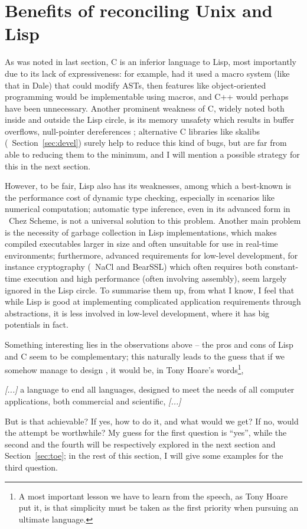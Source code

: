 \section{Benefits of reconciling Unix and Lisp}\label{sec:benefits}

As was noted in last section, C is an inferior language to Lisp, most importantly
due to its lack of expressiveness: for example, had it used a macro system (like
that in Dale) that could modify ASTs, then features like
object-oriented programming would be implementable using macros, and C++ would
perhaps have been unnecessary.  Another prominent weakness of C, widely noted
both inside and outside the Lisp circle, is its memory unsafety which results
in buffer overflows, null-pointer dereferences \etc; alternative C libraries
like skalibs (\cf~Section~\ref{sec:devel}) surely help to reduce this kind
of bugs, but are far from able to reducing them to the minimum, and
I will mention a possible strategy for this in the next section.

However, to be fair, Lisp also has its weaknesses, among which a best-known is
the performance cost of dynamic type checking, especially in scenarios like
numerical computation; automatic type inference, even in its advanced form in
\eg~Chez Scheme, is not a universal solution to this problem.  Another main
problem is the necessity of garbage collection in Lisp implementations, which
makes compiled executables larger in size and often unsuitable for use in
real-time environments; furthermore, advanced requirements for low-level
development, for instance cryptography (\cf~NaCl and BearSSL) which often
requires both constant-time execution and high performance (often involving
assembly), seem largely ignored in the Lisp circle. To summarise them up,
from what I know, I feel that while Lisp is good at implementing complicated
application requirements through abstractions, it is less involved
in low-level development, where it has big potentials in fact.

Something interesting lies in the observations above -- the pros and cons
of Lisp and C seem to be complementary; this naturally leads to the guess
that if we somehow manage to design , it would be,
in Tony Hoare's words\footnote{A most important lesson we
have to learn from the speech, as Tony Hoare put it, is that simplicity must
be taken as the first priority when pursuing an ultimate language.},
\begin{quoting}
	\emph{[...]} a language to end all languages, designed to meet the needs
	of all computer applications, both commercial and scientific, \emph{[...]}
\end{quoting}
But is that achievable?  If yes, how to do it, and what would we get?
If no, would the attempt be worthwhile?  My guess for the first question
is ``yes'', while the second and the fourth will be respectively
explored in the next section and Section~\ref{sec:toe}; in the rest
of this section, I will give some examples for the third question.

